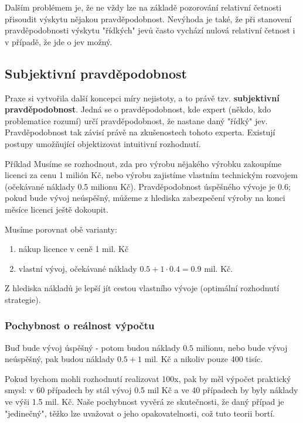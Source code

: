 	Dalším problémem je, že ne vždy lze na základě pozorování relativní četnosti přisoudit výskytu nějakou pravděpodobnost. Nevýhoda je také, že při stanovení pravděpodobnosti výskytu "řídkých" jevů často vychází nulová relativní četnost i v případě, že jde o jev možný.
	
	\subsection{Subjektivní pravděpodobnost}
	Praxe si vytvořila další koncepci míry nejistoty, a to právě tzv. \textbf{subjektivní pravděpodobnost}. Jedná se o pravděpodobnost, kde expert (někdo, kdo problematice rozumí) určí pravděpodobnost, že nastane daný "řídký" jev. Pravděpodobnost tak závisí právě na zkušenostech tohoto experta. Existují postupy umožňující objektizovat intuitivní rozhodnutí.
	
	\begin{note}{Příklad}
		Musíme se rozhodnout, zda pro výrobu nějakého výrobku zakoupíme licenci za cenu 1 milión Kč, nebo výrobu zajistíme vlastním technickým rozvojem (očekávané náklady 0.5 milionu Kč). Pravděpodobnost úspěšného vývoje je 0.6; pokud bude vývoj neúspěšný, můžeme z hlediska zabezpečení výroby na konci měsíce licenci ještě dokoupit.\br
		
		Musíme porovnat obě varianty:
		\begin{enumerate}[label=\alph*), noitemsep]
			\item nákup licence v ceně 1 mil. Kč
			\item vlastní vývoj, očekávané náklady $0.5 + 1\cdot 0.4 = 0.9$ mil. Kč.
		\end{enumerate}
		
		Z hlediska nákladů je lepší jít cestou vlastního vývoje (optimální rozhodnutí strategie). 
		
		\subsubsection*{Pochybnost o reálnost výpočtu}
		Buď bude vývoj úspěšný - potom budou náklady $0.5$ milionu, nebo bude vývoj neúspěšný, pak budou náklady $0.5+1$ mil. Kč a nikoliv pouze 400 tisíc.\br
		
		Pokud bychom mohli rozhodnutí realizovat 100x, pak by měl výpočet praktický smysl: v 60 případech by stál vývoj 0.5 mil Kč a ve 40 případech by byly náklady ve výši 1.5 mil. Kč. Naše pochybnost vyvěrá  ze skutečnosti, že daný případ je "jedinečný", těžko lze uvažovat o jeho opakovatelnosti, což tuto teorii bortí.\br
	\end{note}
	
